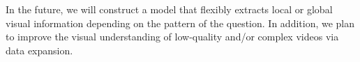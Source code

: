 \documentclass[letterpaper]{article} %
\begin{document}
% 
In the future, we will construct a model that flexibly extracts local or global visual information depending on the pattern of the question.
% 
In addition, we plan to improve the visual understanding of low-quality and/or complex videos via data expansion.

% 


\end{document}
